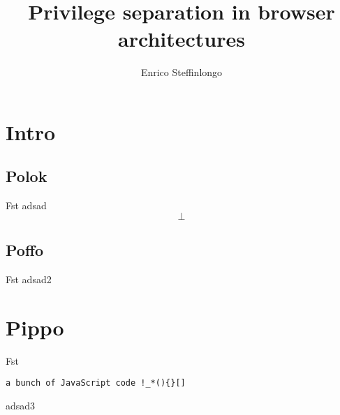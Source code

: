 \documentclass[11pt]{beamer}
\author{Enrico Steffinlongo}
\title{Privilege separation in browser architectures}
\begin{document}
\begin{frame}
\titlepage
\end{frame}

\begin{frame}
\tableofcontents
\end{frame}

\section{Intro}
\subsection{Polok}
\begin{frame}{Fst}
adsad 
$$\bot$$
\end{frame}
\subsection{Poffo}
\begin{frame}{Fst}
adsad2
\end{frame}

\section{Pippo}
\begin{frame}[fragile]{Fst}
\begin{lstlisting}
a bunch of JavaScript code !_*(){}[]
\end{lstlisting}
adsad3
\end{frame}
\end{document}
